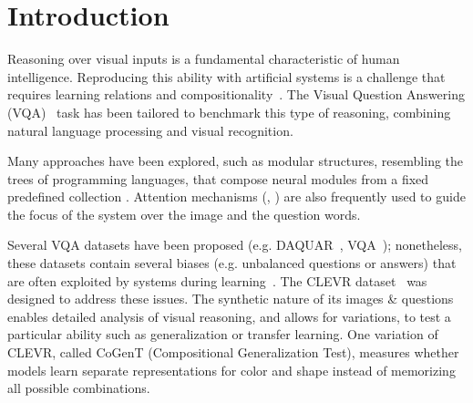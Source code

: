 \section{Introduction}
Reasoning over visual inputs is a fundamental characteristic of human intelligence.
Reproducing this ability with artificial systems is a challenge that requires learning relations and compositionality~\citep{hu2017learning, johnson2017inferring}. The Visual Question Answering (VQA)~\citep{antol2015vqa,malinowski2014towards,wu2017visual} task has been tailored to benchmark this type of reasoning, combining natural language processing and visual recognition.


Many approaches have been explored, 
such as modular structures, resembling the trees of programming languages, that compose neural modules from a fixed predefined collection \cite{andreas2016learning,johnson2017inferring, mascharka2018transparency}. Attention mechanisms (\cite{bahdanau2014neural}, \cite{xu2015show}) are also frequently used to guide the focus of the system over the image and the question words.


Several VQA datasets have been proposed (e.g. DAQUAR~\citep{malinowski2014multi}, VQA~\citep{antol2015vqa}); nonetheless, these datasets contain several biases (e.g. unbalanced questions or answers) that are often exploited by systems during learning~\citep{goyal2017making}.
The CLEVR dataset~\citep{johnson2017clevr} was designed to address these issues. The synthetic nature of its images \& questions enables detailed analysis of visual reasoning, and allows for variations, to test a particular ability such as generalization or transfer learning. One variation of CLEVR, called CoGenT (Compositional Generalization Test), measures whether models learn separate representations for color and shape instead of memorizing all possible combinations.


